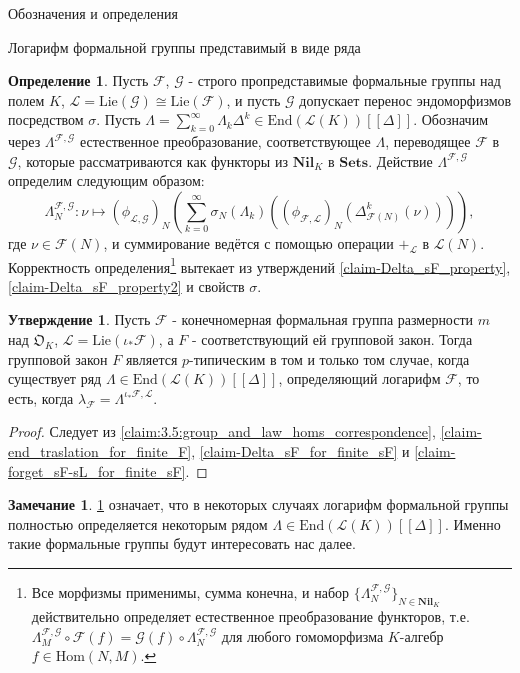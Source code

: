 \documentclass[a4paper,14pt]{extarticle}
\theoremstyle{definition}
\newtheorem{definition}{Определение}[section]
\newtheorem{claim}[theorem]{Утверждение}
\newtheorem{remark}{Замечание}[section]
\newcommand{\Sets}{\mathbf{Sets}}
\newcommand{\End}[1]{\mathrm{End}\left(#1\right)}
\newcommand{\forget}[1]{\phi_{#1}}
\newcommand{\Lie}[1]{\mathrm{Lie}\left(#1\right)}
\newcommand{\Nil}[1]{\mathbf{Nil}_{#1}}
\newcommand{\Hom}[2]{\mathrm{Hom}\left(#1, #2\right)}
\newcommand{\nat}[3]{{#1}^{{\scriptscriptstyle #2, #3 }}}
\newcommand{\fO}{\mathfrak{O}}
\newcommand{\sF}{\mathscr{F}}
\newcommand{\sG}{\mathscr{G}}
\newcommand{\sL}{\mathscr{L}}
\begin{document}
\begin{section}{Обозначения и определения}
\begin{subsection}{Логарифм формальной группы представимый в виде ряда}
\begin{definition}
    Пусть $\sF$, $\sG$ - строго пропредставимые формальные группы над полем $K$, ${ \sL = \Lie{\sG} \cong \Lie{\sF} }$, и пусть $\sG$ допускает перенос эндоморфизмов посредством $\sigma$. Пусть ${ \Lambda = \sum\limits_{k = 0}^\infty \Lambda_k \Delta^k \in \End{\sL(K)}[[\Delta]] }$. Обозначим через $\nat{\Lambda}{\sF}{\sG}$ естественное преобразование, соответствующее $\Lambda$, переводящее $\sF$ в $\sG$, которые рассматриваются как функторы из $\Nil{K}$ в $\Sets$. Действие $\nat{\Lambda}{\sF}{\sG}$ определим следующим образом:
    \begin{equation*}
        \nat{\Lambda}{\sF}{\sG}_N :
        \nu \mapsto
        (\forget{\sL, \sG})_N \left(
            \sum_{k = 0}^\infty
            \sigma_N(\Lambda_k) \left(
                (\forget{\sF, \sL})_N \left(
                    \Delta_{\sF(N)}^k(\nu)
                \right)
            \right)
        \right),
    \end{equation*}
    где ${ \nu \in \sF(N) }$, и суммирование ведётся с помощью операции ${ +_\sL }$ в ${ \sL(N) }$.
    Корректность определения\footnote{
        Все морфизмы применимы, сумма конечна, и набор ${ \{ \nat{\Lambda}{\sF}{\sG}_N \}_{N \in \Nil{K}} }$ действительно определяет естественное преобразование функторов, т.е. ${ \nat{\Lambda}{\sF}{\sG}_M \circ \sF(f) = \sG(f) \circ \nat{\Lambda}{\sF}{\sG}_N }$ для любого гомоморфизма $K$-алгебр ${ f \in \Hom{N}{M} }$.
    } вытекает из утверждений \ref{claim-Delta_sF_property}, \ref{claim-Delta_sF_property2} и свойств $\sigma$.
\end{definition}

\begin{claim}\label{claim-p-typical_criterion_through_Lambda}
    Пусть $\sF$ - конечномерная формальная группа размерности $m$ над $\fO_K$, ${ \sL = \Lie{\iota_* \sF} }$, а $F$ - соответствующий ей групповой закон. Тогда групповой закон $F$ является $p$-типическим в том и только том случае, когда существует ряд ${ \Lambda \in \End{\sL(K)}[[\Delta]] }$, определяющий логарифм $\sF$, то есть, когда ${ \lambda_\sF = \nat{\Lambda}{\iota_* \sF}{\sL} }$.
\end{claim}
\begin{proof}
    Следует из \ref{claim:3.5:group_and_law_homs_correspondence}, \ref{claim-end_traslation_for_finite_F}, \ref{claim-Delta_sF_for_finite_sF} и \ref{claim-forget_sF-sL_for_finite_sF}.
\end{proof}

\begin{remark}
    \ref{claim-p-typical_criterion_through_Lambda} означает, что в некоторых случаях логарифм формальной группы полностью определяется некоторым рядом ${ \Lambda \in \End{\sL(K)}[[\Delta]] }$. Именно такие формальные группы будут интересовать нас далее.
\end{remark}


\end{subsection}
\end{section}
\end{document}
